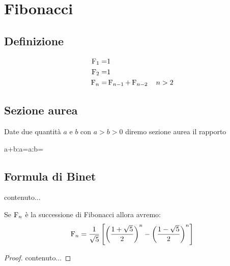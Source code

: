 \chapter{Fibonacci}
\section{Definizione}
\begin{defn}
	\begin{align}
		\operatorname{F}_{1}=&1\notag\\
		\operatorname{F}_{2}=&1\notag\\
		\operatorname{F}_{n}=&\operatorname{F}_{n-1}+\operatorname{F}_{n-2}\quad n>2\label{eqn:Fibodef}
	\end{align}
\end{defn}
\section{Sezione aurea}
\begin{defn}
	Date due quantità $a$ e $b$ con $a>b>0$ diremo sezione aurea il rapporto
	\begin{eqn}
	a+b:a=a:b=\phi	
	\end{eqn}\label{eqn:FibAureaDef}
\end{defn}
\section{Formula di Binet}
\begin{lem}
	contenuto...
\end{lem}
\begin{thm}
	Se $\operatorname{F}_{n}$ è la successione di Fibonacci allora avremo:
	\begin{equation}
		\operatorname{F}_{n}=\dfrac{1}{\sqrt{5}}\left[\left(\dfrac{1+\sqrt{5}}{2}\right)^n-\left(\dfrac{1-\sqrt{5}}{2}\right)^n\right]
	\end{equation}\label{eqn:FinBinet}
\end{thm}
\begin{proof}
	contenuto...
\end{proof}